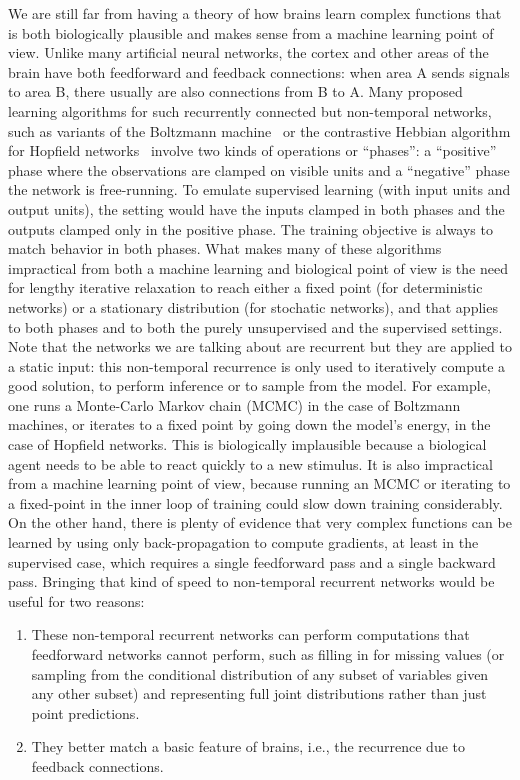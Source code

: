 \documentclass{article}
\begin{document}
We are still far from having a theory of how brains learn complex functions
that is both biologically plausible and makes sense from a machine learning
point of view. Unlike many artificial neural networks, the cortex and other
areas of the brain have both feedforward and feedback connections: when
area A sends signals to area B, there usually are also connections from B
to A. Many proposed learning algorithms for such recurrently connected
but non-temporal networks, such as variants of the Boltzmann machine~\citep{Hinton84} or the
contrastive Hebbian algorithm for Hopfield
networks~\citep{Movelland+McClelland91,Xie+Seung-2003} involve two kinds of operations or
``phases'': a ``positive'' phase where the observations are clamped on
visible units and a ``negative'' phase the network is free-running.
To emulate supervised learning (with input units and output units),
the setting would have the inputs clamped in both phases and the outputs
clamped only in the positive phase. The training objective is always
to match behavior in both phases. What makes many of these algorithms
impractical from both a machine learning and biological point of view
is the need for lengthy iterative relaxation to reach either a fixed point
(for deterministic networks) or a stationary distribution (for stochatic
networks), and that applies to both phases and to both the purely
unsupervised and the supervised settings. Note that the networks we
are talking about are recurrent but they are applied to a static
input: this non-temporal recurrence is only used to iteratively
compute a good solution, to perform
inference or to sample from the model.
For example, one runs a Monte-Carlo Markov
chain (MCMC) in the case of Boltzmann machines, or iterates to a fixed point
by going down the model's energy, in
the case of Hopfield networks.
This is biologically implausible because a biological
agent needs to be able to react quickly to a new stimulus. It is also impractical
from a machine learning point of view, because running an MCMC or
iterating to a fixed-point in the inner loop of training could slow
down training considerably. On the other hand, there is plenty of evidence
that very complex functions can be learned by using only back-propagation
to compute gradients, at least in the supervised case,
which requires a single feedforward pass and a single
backward pass. Bringing that kind of speed to non-temporal recurrent networks would
be useful for two reasons:
\begin{enumerate}
  \item These non-temporal recurrent networks can perform
    computations that feedforward networks cannot perform, such as
    filling in for missing values (or sampling from the conditional
    distribution of any subset of variables given any other subset)
    and representing full joint distributions rather than just point predictions.
  \item They better match a basic feature of brains, i.e., the recurrence
    due to feedback connections.
\end{enumerate}
\end{document}
